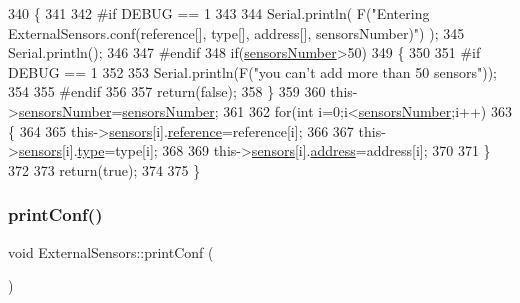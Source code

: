\begin{DoxyCode}
340 \{
341 
342 \textcolor{preprocessor}{#if DEBUG == 1}
343 
344     Serial.println( F(\textcolor{stringliteral}{"Entering ExternalSensors.conf(reference[], type[], address[], sensorsNumber)"}) );
345     Serial.println();
346 
347 \textcolor{preprocessor}{#endif  }
348     \textcolor{keywordflow}{if}(\hyperlink{class_external_sensors_a58e4fbf9adeae787d92be5fa33043b5d}{sensorsNumber}>50)
349     \{
350     
351 \textcolor{preprocessor}{    #if DEBUG == 1}
352     
353         Serial.println(F(\textcolor{stringliteral}{"you can't add more than 50 sensors"}));    
354     
355 \textcolor{preprocessor}{    #endif  }
356     
357         \textcolor{keywordflow}{return}(\textcolor{keyword}{false});
358     \}
359 
360     this->\hyperlink{class_external_sensors_a58e4fbf9adeae787d92be5fa33043b5d}{sensorsNumber}=\hyperlink{class_external_sensors_a58e4fbf9adeae787d92be5fa33043b5d}{sensorsNumber};
361     
362     \textcolor{keywordflow}{for}(\textcolor{keywordtype}{int} i=0;i<\hyperlink{class_external_sensors_a58e4fbf9adeae787d92be5fa33043b5d}{sensorsNumber};i++)
363     \{
364     
365         this->\hyperlink{class_external_sensors_a284233f884fcf00154a44740cf1d9e1e}{sensors}[i].\hyperlink{struct_external_sensors_1_1sensor_afed5bdfd49732202a368b600cb8396fe}{reference}=reference[i];
366         
367         this->\hyperlink{class_external_sensors_a284233f884fcf00154a44740cf1d9e1e}{sensors}[i].\hyperlink{struct_external_sensors_1_1sensor_a6acfdb02c742c2110d7bd2b5d9fce9e7}{type}=type[i];
368 
369         this->\hyperlink{class_external_sensors_a284233f884fcf00154a44740cf1d9e1e}{sensors}[i].\hyperlink{struct_external_sensors_1_1sensor_a8d70ca58524521ed054fc6b81eb58d34}{address}=address[i];
370     
371     \}
372     
373     \textcolor{keywordflow}{return}(\textcolor{keyword}{true});
374 
375 \}
\end{DoxyCode}
\mbox{\label{class_external_sensors_a78c2bf55084435dd51d3c559b2d3c6f3}} 
\subsubsection{\texorpdfstring{print\+Conf()}{printConf()}}
{\footnotesize\ttfamily void External\+Sensors\+::print\+Conf (\begin{DoxyParamCaption}{ }\end{DoxyParamCaption})}

